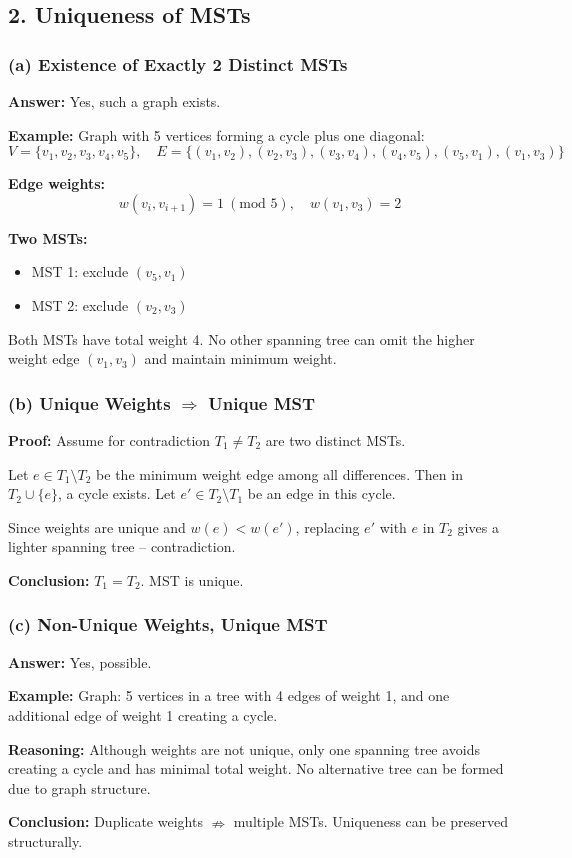\documentclass[12pt]{article}
\begin{document}
\newpage

\subsection*{2. Uniqueness of MSTs}

\subsubsection*{(a) Existence of Exactly 2 Distinct MSTs}

\textbf{Answer:} Yes, such a graph exists.

\textbf{Example:}  
Graph with 5 vertices forming a cycle plus one diagonal:
\[
V = \{v_1, v_2, v_3, v_4, v_5\},\quad E = \{(v_1,v_2), (v_2,v_3), (v_3,v_4), (v_4,v_5), (v_5,v_1), (v_1,v_3)\}
\]

\textbf{Edge weights:}
\[
w(v_i,v_{i+1}) = 1\ (\text{mod }5), \quad w(v_1,v_3) = 2
\]

\textbf{Two MSTs:}
\begin{itemize}
    \item MST 1: exclude \( (v_5,v_1) \)
    \item MST 2: exclude \( (v_2,v_3) \)
\end{itemize}
Both MSTs have total weight 4. No other spanning tree can omit the higher weight edge \( (v_1,v_3) \) and maintain minimum weight.

\subsubsection*{(b) Unique Weights \( \Rightarrow \) Unique MST}

\textbf{Proof:}
Assume for contradiction \( T_1 \neq T_2 \) are two distinct MSTs.

Let \( e \in T_1 \setminus T_2 \) be the minimum weight edge among all differences. Then in \( T_2 \cup \{e\} \), a cycle exists. Let \( e' \in T_2 \setminus T_1 \) be an edge in this cycle.

Since weights are unique and \( w(e) < w(e') \), replacing \( e' \) with \( e \) in \( T_2 \) gives a lighter spanning tree – contradiction.

\textbf{Conclusion:} \( T_1 = T_2 \). MST is unique.

\subsubsection*{(c) Non-Unique Weights, Unique MST}

\textbf{Answer:} Yes, possible.

\textbf{Example:}  
Graph: 5 vertices in a tree with 4 edges of weight 1, and one additional edge of weight 1 creating a cycle.

\textbf{Reasoning:}
Although weights are not unique, only one spanning tree avoids creating a cycle and has minimal total weight. No alternative tree can be formed due to graph structure.

\textbf{Conclusion:} Duplicate weights \( \nRightarrow \) multiple MSTs. Uniqueness can be preserved structurally.
\end{document}

